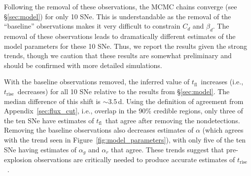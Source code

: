 \documentclass[twocolumn]{./aastex63}
\newcommand{\tfl}{$t_\mathrm{fl}$}
\newcommand{\trise}{$t_\mathrm{rise}$}
\begin{document}
Following the removal of these observations, the MCMC chains converge (see
\S\ref{sec:model}) for only 10 SNe. This is understandable as the removal of
the ``baseline'' observations makes it very difficult to constrain $C_d$ and
$\beta_d$. The removal of these observations leads to dramatically different
estimates of the model parameters for these 10 SNe. Thus, we report the
results given the strong trends, though we caution that these results are
somewhat preliminary and should be confirmed with more detailed simulations.

With the baseline observations removed, the inferred value of \tfl\ increases
(i.e., \trise\ decreases) for all 10 SNe relative to the results from
\S\ref{sec:model}. The median difference of this shift is $\sim$3.5\,d. Using
the definition of agreement from Appendix~\ref{sec:flux_cut}, i.e., overlap in
the 90\% credible regions, only three of the ten SNe have estimates of \tfl\
that agree after removing the nondetections. Removing the baseline
observations also decreases estimates of $\alpha$ (which agrees with the trend
seen in Figure~\ref{fig:model_parameters}), with only five of the ten SNe
having estimates of $\alpha_g$ and $\alpha_r$ that agree. These trends suggest
that pre-explosion observations are critically needed to produce accurate
estimates of \trise\ \citep[see also][]{Gonzalez-Gaitan12}.




\end{document}
